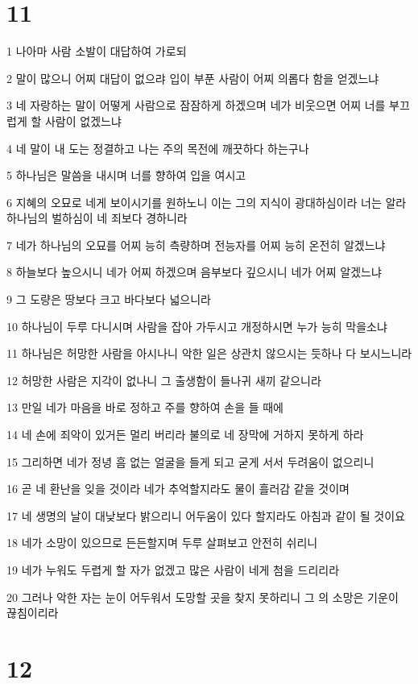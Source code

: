\chapter{11}

\par 1 나아마 사람 소발이 대답하여 가로되
\par 2 말이 많으니 어찌 대답이 없으랴 입이 부푼 사람이 어찌 의롭다 함을 얻겠느냐
\par 3 네 자랑하는 말이 어떻게 사람으로 잠잠하게 하겠으며 네가 비웃으면 어찌 너를 부끄럽게 할 사람이 없겠느냐
\par 4 네 말이 내 도는 정결하고 나는 주의 목전에 깨끗하다 하는구나
\par 5 하나님은 말씀을 내시며 너를 향하여 입을 여시고
\par 6 지혜의 오묘로 네게 보이시기를 원하노니 이는 그의 지식이 광대하심이라 너는 알라 하나님의 벌하심이 네 죄보다 경하니라
\par 7 네가 하나님의 오묘를 어찌 능히 측량하며 전능자를 어찌 능히 온전히 알겠느냐
\par 8 하늘보다 높으시니 네가 어찌 하겠으며 음부보다 깊으시니 네가 어찌 알겠느냐
\par 9 그 도량은 땅보다 크고 바다보다 넓으니라
\par 10 하나님이 두루 다니시며 사람을 잡아 가두시고 개정하시면 누가 능히 막을소냐
\par 11 하나님은 허망한 사람을 아시나니 악한 일은 상관치 않으시는 듯하나 다 보시느니라
\par 12 허망한 사람은 지각이 없나니 그 출생함이 들나귀 새끼 같으니라
\par 13 만일 네가 마음을 바로 정하고 주를 향하여 손을 들 때에
\par 14 네 손에 죄악이 있거든 멀리 버리라 불의로 네 장막에 거하지 못하게 하라
\par 15 그리하면 네가 정녕 흠 없는 얼굴을 들게 되고 굳게 서서 두려움이 없으리니
\par 16 곧 네 환난을 잊을 것이라 네가 추억할지라도 물이 흘러감 같을 것이며
\par 17 네 생명의 날이 대낮보다 밝으리니 어두움이 있다 할지라도 아침과 같이 될 것이요
\par 18 네가 소망이 있으므로 든든할지며 두루 살펴보고 안전히 쉬리니
\par 19 네가 누워도 두렵게 할 자가 없겠고 많은 사람이 네게 첨을 드리리라
\par 20 그러나 악한 자는 눈이 어두워서 도망할 곳을 찾지 못하리니 그 의 소망은 기운이 끊침이리라

\chapter{12}

